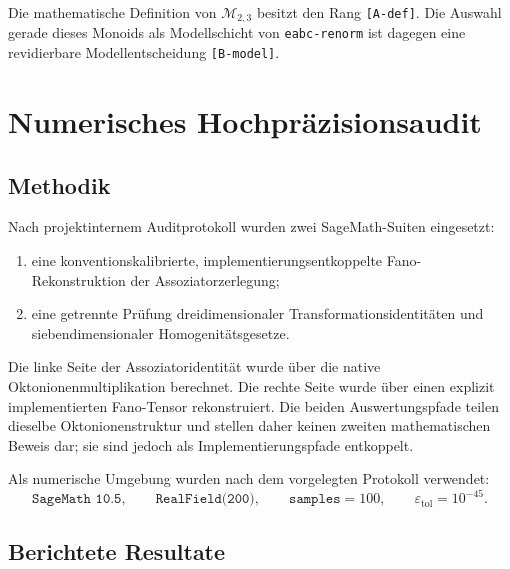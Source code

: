 \documentclass[11pt,a4paper]{article}
\theoremstyle{definition}
\newcommand{\MtwoThree}{\mathcal M_{2,3}}
\begin{document}
Die mathematische Definition von $\MtwoThree$ besitzt den Rang \texttt{[A-def]}. Die Auswahl gerade dieses Monoids als Modellschicht von \texttt{eabc-renorm} ist dagegen eine revidierbare Modellentscheidung \texttt{[B-model]}.

\section{Numerisches Hochpräzisionsaudit}

\subsection{Methodik}

Nach projektinternem Auditprotokoll wurden zwei SageMath-Suiten eingesetzt:
\begin{enumerate}
  \item eine konventionskalibrierte, implementierungsentkoppelte Fano-Rekonstruktion der Assoziatorzerlegung;
  \item eine getrennte Prüfung dreidimensionaler Transformationsidentitäten und siebendimensionaler Homogenitätsgesetze.
\end{enumerate}

Die linke Seite der Assoziatoridentität wurde über die native Oktonionenmultiplikation berechnet. Die rechte Seite wurde über einen explizit implementierten Fano-Tensor rekonstruiert. Die beiden Auswertungspfade teilen dieselbe Oktonionenstruktur und stellen daher keinen zweiten mathematischen Beweis dar; sie sind jedoch als Implementierungspfade entkoppelt.

Als numerische Umgebung wurden nach dem vorgelegten Protokoll verwendet:
\[
\texttt{SageMath 10.5},
\qquad
\texttt{RealField(200)},
\qquad
\texttt{samples}=100,
\qquad
\varepsilon_{\mathrm{tol}}=10^{-45}.
\]

\subsection{Berichtete Resultate}
\end{document}
